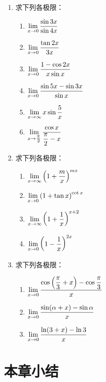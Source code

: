 \begin{ex}
\begin{enumerate}
    \item 求下列各极限：
\begin{multicols}{2}
\begin{enumerate}[(1)]
    \item $\lim\limits_{x\to 0} \dfrac{\sin 3x}{\sin 4x}$
    \item $\lim\limits_{x\to 0} \dfrac{\tan 2x}{3x}$
    \item $\lim\limits_{x\to 0} \dfrac{1-\cos 2x}{x\sin x}$
    \item $\lim\limits_{x\to 0} \dfrac{\sin5x-\sin3x}{\sin x}$
    \item $\lim\limits_{x\to \infty} x\sin\dfrac{5}{x}$
    \item $\lim\limits_{x\to \tfrac{\pi}{2}} \dfrac{\cos x}{\dfrac{\pi}{2}-x}$
\end{enumerate}
\end{multicols}

\item 求下列各极限：
\begin{multicols}{2}
    \begin{enumerate}[(1)]
        \item $\lim\limits_{x\to \infty}\left(1+\dfrac{m}{x}\right)^{mx} $
        \item $\lim\limits_{x\to 0}\left(1+\tan x\right)^{\cot x} $
        \item $\lim\limits_{x\to \infty} \left(1+\dfrac{1}{x}\right)^{x+2}$
        \item $\lim\limits_{x\to 0} \left(1-\dfrac{1}{x}\right)^{2x}$
    \end{enumerate}
\end{multicols}

\item 求下列各极限：
\begin{multicols}{2}
    \begin{enumerate}[(1)]
        \item $\lim\limits_{x\to 0} \dfrac{\cos\left(\dfrac{\pi}{3}+x\right)-\cos\dfrac{\pi}{3}}{x}$
        \item $\lim\limits_{x\to 0} \dfrac{\sin(\alpha+x)-\sin\alpha}{x}$
        \item $\lim\limits_{x\to 0} \dfrac{\ln(3+x)-\ln 3}{x}$
    \end{enumerate}
\end{multicols}
\end{enumerate}    
\end{ex}

\section{本章小结}

